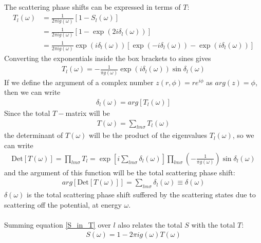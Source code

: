 \documentclass[twoside]{report}
\numberwithin{equation}{section}
\begin{document}
The scattering phase shifts can be expressed in terms of \(T\):
\begin{equation}\begin{aligned}
	T_l(\omega) &= \frac{1}{2\pi i g(\omega)}\left[ 1 - S_l(\omega) \right]\\
		    &= \frac{1}{2\pi i g(\omega)}\left[1 - \exp\left( 2 i \delta_l(\omega) \right)\right]\\
		    &=\frac{1}{2\pi i g(\omega)}\exp\left(i \delta_l(\omega) \right)\left[\exp\left( - i \delta_l(\omega) \right) - \exp\left(i \delta_l(\omega) \right)\right]
\end{aligned}\end{equation}
Converting the exponentials inside the box brackets to sines gives
\begin{equation}\begin{aligned}
	\label{tmatphase}
	T_l(\omega) = -\frac{1}{\pi g(\omega)}\exp\left(i \delta_l(\omega) \right)\sin \delta_l(\omega)
\end{aligned}\end{equation}
If we define the argument of a complex number \(z(r,\phi) = r e^{i\phi}\) as \(arg(z) = \phi\), then we can write
\begin{equation}\begin{aligned}
	\delta_l(\omega) = arg\left[ T_l(\omega) \right] 
\end{aligned}\end{equation}
Since the total \(T-\)matrix will be 
\begin{equation}\begin{aligned}
	T(\omega) = \sum_{lm\sigma} T_l(\omega)
\end{aligned}\end{equation}
the determinant of \(T(\omega)\) will be the product of the eigenvalues \(T_l(\omega)\), so we can write
\begin{equation}\begin{aligned}
	\text{Det}\left[ T(\omega) \right] = \prod_{lm\sigma} T_l = \exp\left[ i\sum_{lm\sigma} \delta_l(\omega) \right] \prod_{lm\sigma}\left( -\frac{1}{\pi g(\omega)}\right)\sin \delta_l(\omega)
\end{aligned}\end{equation}
and the argument of this function will be the total scattering phase shift:
\begin{equation}\begin{aligned}
	\label{phase_in_T}
	arg\left[\text{Det}\left[ T(\omega) \right]\right] = \sum_{lm\sigma} \delta_l(\omega) \equiv \delta(\omega)
\end{aligned}\end{equation}
\(\delta(\omega)\) is the total scattering phase shift suffered by the scattering states due to scattering off the potential, at energy \(\omega\).
\\\\Summing equation \ref{S_in_T} over \(l\) also relates the total \(S\) with the total \(T\):
\begin{equation}\begin{aligned}
	S(\omega) = 1 - 2\pi i g(\omega) T(\omega)
\end{aligned}\end{equation}
\end{document}
